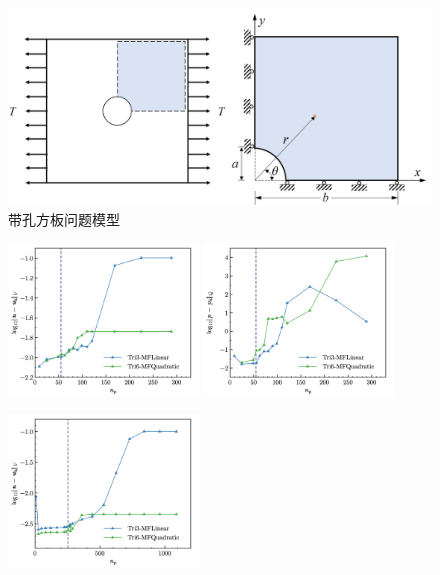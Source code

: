 \begin{figure}[!h]
    \centering 
        \includegraphics[scale=0.5]{figures/ch_4/hole.png}
        \caption{带孔方板问题模型}\label{ch_4:fig:hole}
\end{figure}
\begin{figure}[H]
    \centering
    \begin{subcaptiongroup}
    \includegraphics[width=0.45\textwidth]{figures/ch_4/plate_with_hole_4_L2_u.png}
    \label{hole_4_L2_u}
    \includegraphics[width=0.45\textwidth]{figures/ch_4/plate_with_hole_4_L2_p.png}
    \label{hole_4_L2_p}
    \end{subcaptiongroup}
    \begin{subcaptiongroup}
    \includegraphics[width=0.45\textwidth]{figures/ch_4/plate_with_hole_8_L2_u.png}

\end{subcaptiongroup}
\end{figure}

